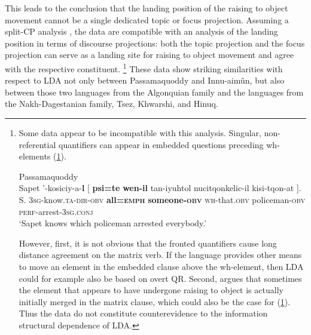 \documentclass[output=paper
,modfonts
,nonflat]{langsci/langscibook}
\begin{document}
This leads \citet{Bruening2001a} to the conclusion that the landing position of the raising to object movement cannot be a single dedicated topic or focus projection. Assuming a split-CP analysis \citep{Rizzi1997}, the data are compatible with an analysis of the landing position in terms of discourse projections: both the topic projection and the focus projection can serve as a landing site for raising to object movement and agree with the respective constituent. \footnote{Some data appear to be incompatible with this analysis. Singular, non-referential quantifiers can appear in embedded questions preceding wh-elements (\ref{ex:passam_qr}).
\begin{exe}
\ex Passamaquoddy \citep[][282]{Bruening2001a}\label{ex:passam_qr}\\
	\gll Sapet '-kosiciy-a-\textbf{l} [ \textbf{psi=te} \textbf{wen-il} tan-iyuhtol nucitqonkelic-il kisi-tqon-at ].\\
		 S. \textsc{3sg}-know.\textsc{ta-dir-obv} {} \textbf{all=\textsc{emph}} \textbf{someone-\textsc{obv}}  \textsc{wh}-that.\textsc{obv} policeman-\textsc{obv} \textsc{perf}-arrest-\textsc{3sg.conj}\\
	\glt `Sapet knows which policeman arrested everybody.'
\end{exe}
However, first, it is not obvious that the fronted quantifiers cause long distance agreement on the matrix verb. If the language provides other means to move an element in the embedded clause above the wh-element, then LDA could for example also be based on overt QR. Second, \citet{Bruening2001a} argues that sometimes the element that appears to have undergone raising to object is actually initially merged in the matrix clause, which could also be the case for (\ref{ex:passam_qr}). Thus the data do not constitute counterevidence to the information structural dependence of LDA.} These data show striking similarities with respect to LDA not only between Passamaquoddy and Innu-aim\^{u}n, but also between those two languages from the Algonquian family and the languages from the Nakh-Dagestanian family, Tsez, Khwarshi, and Hinuq.
\end{document}
